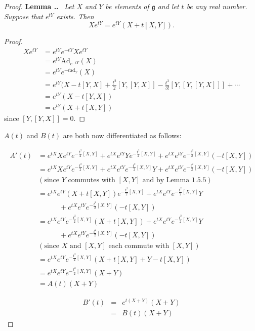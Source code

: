 \documentclass[honours]{UNSWthesis}
\newcommand{\g}{\mathfrak{g}}
\newcommand{\1}{\mathbf{e}_{1}}
\newcommand{\2}{\mathbf{e}_{3}}
\newcommand{\3}{\mathbf{e}_{3}}
\newcounter{Item}[section]
\newenvironment{Lemma}{\medskip
                            \refstepcounter{Item}
                            \noindent
                           {\bf Lemma \thesection.\theItem.}\ %
                            \begingroup \sl}
                           {\endgroup\medskip}
\begin{document}
\begin{proof}
\begin{Lemma}
Let $X$ and $Y$ be elements of $\g$ and let $t$ be any real number. Suppose that $e^{tY}$ exists. Then
\[
Xe^{tY}=e^{tY}(X+t[X,Y]).
\]
\end{Lemma}

\begin{proof}
\begin{align*}
Xe^{tY} &= e^{tY}e^{-tY}Xe^{tY} \\
&= e^{tY}\mathrm{Ad}_{e^{-tY}}(X) \\
&= e^{tY}e^{-t\mathrm{ad}_{Y}}(X) \\
&= e^{tY}(X-t[Y,X]+\frac{t^{2}}{2}[Y,[Y,X]]-\frac{t^{3}}{3!}[Y,[Y,[Y,X]]]+\cdots \\
&= e^{tY}(X - t[Y,X])\\
&= e^{tY}(X + t[X,Y])
\end{align*}
since $[Y,[Y,X]]=0$.
\end{proof}

$A(t)$ and $B(t)$ are both now differentiated as follows:

\begin{align*}
A'(t) &= e^{tX}Xe^{tY}e^{-\frac{t^2}{2}[X,Y]}+e^{tX}e^{tY}Ye^{-\frac{t^2}{2}[X,Y]}+e^{tX}e^{tY}e^{-\frac{t^2}{2}[X,Y]}(-t[X,Y]) \\
&= e^{tX}Xe^{tY}e^{-\frac{t^2}{2}[X,Y]}+e^{tX}e^{tY}e^{-\frac{t^2}{2}[X,Y]}Y  +e^{tX}e^{tY}e^{-\frac{t^2}{2}[X,Y]}(-t[X,Y]) \\
& (\text{since $Y$ commutes with $[X,Y]$ and by Lemma 1.5.5})\\
&= e^{tX}e^{tY}(X+t[X,Y])e^{-\frac{t^2}{2}[X,Y]}+e^{tX}e^{tY}e^{-\frac{t^2}{2}[X,Y]}Y\\
& \quad \quad \quad +e^{tX}e^{tY}e^{-\frac{t^2}{2}[X,Y]}(-t[X,Y]) \\
&= e^{tX}e^{tY}e^{-\frac{t^2}{2}[X,Y]}(X+t[X,Y])+e^{tX}e^{tY}e^{-\frac{t^2}{2}[X,Y]}Y\\
& \quad \quad \quad+e^{tX}e^{tY}e^{-\frac{t^2}{2}[X,Y]}(-t[X,Y]) \\
&  (\text{since $X$ and $[X,Y]$ each commute with $[X,Y]$})\\
&= e^{tX}e^{tY}e^{-\frac{t^2}{2}[X,Y]}(X+t[X,Y]+Y-t[X,Y]) \\
&= e^{tX}e^{tY}e^{-\frac{t^2}{2}[X,Y]}(X+Y) \\
&= A(t)(X+Y)
\end{align*}

\begin{eqnarray*}
B'(t) &=& e^{t(X+Y)}(X+Y) \\
&=& B(t)(X+Y)
\end{eqnarray*}


\end{proof}
\end{document}
